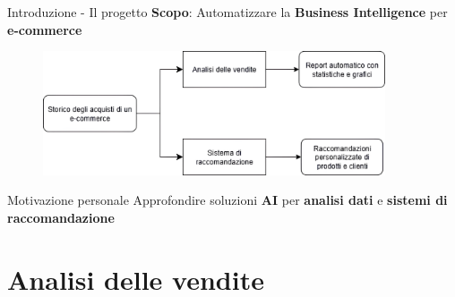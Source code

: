 \documentclass{beamer}
\begin{document}
	\begin{frame}{Introduzione - Il progetto}
		\textbf{Scopo}: Automatizzare la \textbf{Business Intelligence} per \textbf{e-commerce}

		\begin{figure}
			\centering
			\includegraphics[width=0.9\textwidth]{Diagramma di flusso del progetto.png}
		\end{figure}

		\begin{block}{Motivazione personale}
			Approfondire soluzioni \textbf{AI} per \textbf{analisi dati} e \textbf{sistemi di raccomandazione}
		\end{block}
	\end{frame}


	\section{Analisi delle vendite}
\end{document}

